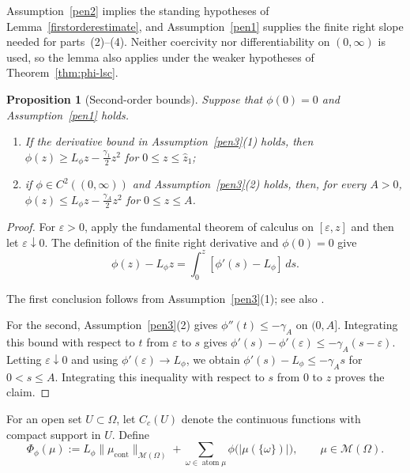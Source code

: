 \documentclass[11pt]{amsart}
\newtheorem{proposition}[theorem]{Proposition}
\theoremstyle{definition}
\theoremstyle{remark}
\DeclareMathOperator{\atom}{atom}
\DeclareMathOperator{\cont}{cont}
\begin{document}
Assumption~\ref{pen2} implies the standing hypotheses of
Lemma~\ref{firstorderestimate}, and Assumption~\ref{pen1} supplies the finite
right slope needed for parts~(2)--(4). Neither coercivity nor differentiability
on $(0,\infty)$ is used, so the lemma also applies under the weaker hypotheses
of Theorem~\ref{thm:phi-lsc}.


\begin{proposition}[Second-order bounds]\label{secondorderestimate}
Suppose that $\phi(0)=0$ and Assumption~\ref{pen1} holds.
\begin{enumerate}
	\item If the derivative bound in Assumption~\ref{pen3}(1) holds, then
	$\phi(z)\ge L_\phi z-\frac{\gamma_1}{2}z^2$ for
	$0\le z\le\hat z_1$;
	\item if $\phi\in C^2((0,\infty))$ and Assumption~\ref{pen3}(2) holds,
	then, for every $A>0$,
	$\phi(z)\le L_\phi z-\frac{\gamma_A}{2}z^2$ for
	$0\le z\le A$.
\end{enumerate}
\end{proposition}
\begin{proof}
For $\varepsilon>0$, apply the fundamental theorem of calculus on
$[\varepsilon,z]$ and then let $\varepsilon\downarrow0$. The definition of
the finite right derivative and $\phi(0)=0$ give
\begin{equation*}
	\phi(z)-L_\phi z
	=\int_0^z[\phi'(s)-L_\phi]\,ds.
\end{equation*}

The first conclusion follows from Assumption~\ref{pen3}(1); see also \cite{pieper2022nonconvex}.

For the second, Assumption~\ref{pen3}(2) gives
$\phi''(t)\le-\gamma_A$ on $(0,A]$. Integrating this bound with respect
to $t$ from $\varepsilon$ to $s$ gives
$\phi'(s)-\phi'(\varepsilon)\le-\gamma_A(s-\varepsilon)$.
Letting $\varepsilon\downarrow0$ and using
$\phi'(\varepsilon)\to L_\phi$, we obtain
$\phi'(s)-L_\phi\le-\gamma_A s$ for $0<s\le A$.
Integrating this inequality with respect to $s$ from $0$ to $z$ proves the claim.
\end{proof}

For an open set $U\subset\Omega$, let $C_c(U)$ denote the continuous
functions with compact support in $U$.
Define
\begin{equation}
\label{eq:concave-measure-functional}
	\Phi_\phi(\mu)
	:=L_\phi\|\mu_{\cont}\|_{\mathcal M(\Omega)}
	+\sum_{\omega\in\atom\mu}
		\phi\bigl(|\mu(\{\omega\})|\bigr),
	\qquad \mu\in\mathcal M(\Omega).
\end{equation}
\end{document}
